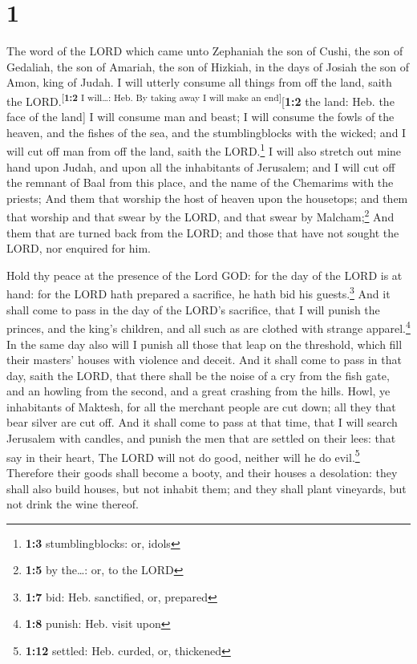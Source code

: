 \hypertarget{section}{%
\section{1}\label{section}}

 The word of the LORD which came unto Zephaniah the son of
Cushi, the son of Gedaliah, the son of Amariah, the son of Hizkiah, in
the days of Josiah the son of Amon, king of Judah.  I will
utterly consume all things from off the land, saith the
LORD.\textsuperscript{{[}\textbf{1:2} I will\ldots: Heb. By taking away
I will make an end{]}}{[}\textbf{1:2} the land: Heb. the face of the
land{]}  I will consume man and beast; I will consume the
fowls of the heaven, and the fishes of the sea, and the stumblingblocks
with the wicked; and I will cut off man from off the land, saith the
LORD.\footnote{\textbf{1:3} stumblingblocks: or, idols}  I
will also stretch out mine hand upon Judah, and upon all the inhabitants
of Jerusalem; and I will cut off the remnant of Baal from this place,
and the name of the Chemarims with the priests;  And them
that worship the host of heaven upon the housetops; and them that
worship and that swear by the LORD, and that swear by
Malcham;\footnote{\textbf{1:5} by the\ldots: or, to the LORD}
 And them that are turned back from the LORD; and those
that have not sought the LORD, nor enquired for him.

 Hold thy peace at the presence of the Lord GOD: for the
day of the LORD is at hand: for the LORD hath prepared a sacrifice, he
hath bid his guests.\footnote{\textbf{1:7} bid: Heb. sanctified, or,
  prepared}  And it shall come to pass in the day of the
LORD's sacrifice, that I will punish the princes, and the king's
children, and all such as are clothed with strange apparel.\footnote{\textbf{1:8}
  punish: Heb. visit upon}  In the same day also will I
punish all those that leap on the threshold, which fill their masters'
houses with violence and deceit.  And it shall come to
pass in that day, saith the LORD, that there shall be the noise of a cry
from the fish gate, and an howling from the second, and a great crashing
from the hills.  Howl, ye inhabitants of Maktesh, for all
the merchant people are cut down; all they that bear silver are cut off.
 And it shall come to pass at that time, that I will
search Jerusalem with candles, and punish the men that are settled on
their lees: that say in their heart, The LORD will not do good, neither
will he do evil.\footnote{\textbf{1:12} settled: Heb. curded, or,
  thickened}  Therefore their goods shall become a booty,
and their houses a desolation: they shall also build houses, but not
inhabit them; and they shall plant vineyards, but not drink the wine
thereof.

